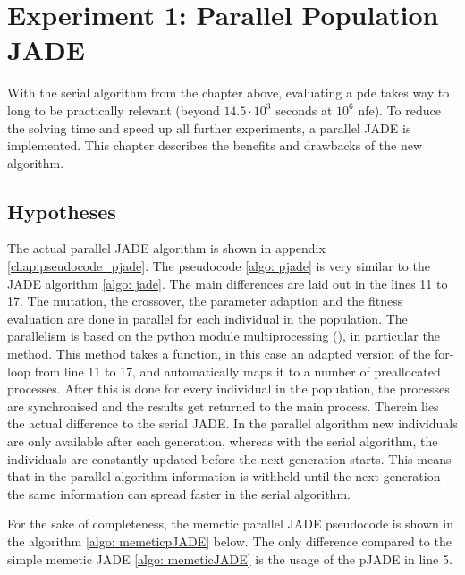 \documentclass[./\jobname.tex]{subfiles}
\begin{document}
\chapter {Experiment 1: Parallel Population JADE}
\label{chap:experimet_1}

With the serial algorithm from the chapter above, evaluating a \gls{pde} takes way to long to be practically relevant (beyond $14.5 \cdot 10^3$ seconds at $10^6$ \gls{nfe}). To reduce the solving time and speed up all further experiments, a parallel JADE is implemented. This chapter describes the benefits and drawbacks of the new algorithm.  

\section{Hypotheses}
The actual parallel JADE algorithm is shown in appendix \ref{chap:pseudocode_pjade}. The pseudocode \ref{algo: pjade} is very similar to the JADE algorithm \ref{algo: jade}. The main differences are laid out in the lines 11 to 17. The mutation, the crossover, the parameter adaption and the fitness evaluation are done in parallel for each individual in the population. The parallelism is based on the python module multiprocessing (\cite{python_standard_library_multiprocessing_2020}), in particular the  method. This method takes a function, in this case an adapted version of the for-loop from line 11 to 17, and automatically maps it to a number of preallocated processes. After this is done for every individual in the population, the processes are synchronised and the results get returned to the main process. Therein lies the actual difference to the serial JADE. In the parallel algorithm new individuals are only available after each generation, whereas with the serial algorithm, the individuals are constantly updated before the next generation starts. This means that in the parallel algorithm information is withheld until the next generation - the same information can spread faster in the serial algorithm.  

For the sake of completeness, the memetic parallel JADE pseudocode is shown in the algorithm \ref{algo: memeticpJADE} below. The only difference compared to the simple memetic JADE \ref{algo: memeticJADE} is the usage of the pJADE in line 5. 

\begin{algorithm}[h]
	\SetAlgoNoLine
	\DontPrintSemicolon
	\label{algo: memeticpJADE}
\end{algorithm}
\end{document}
